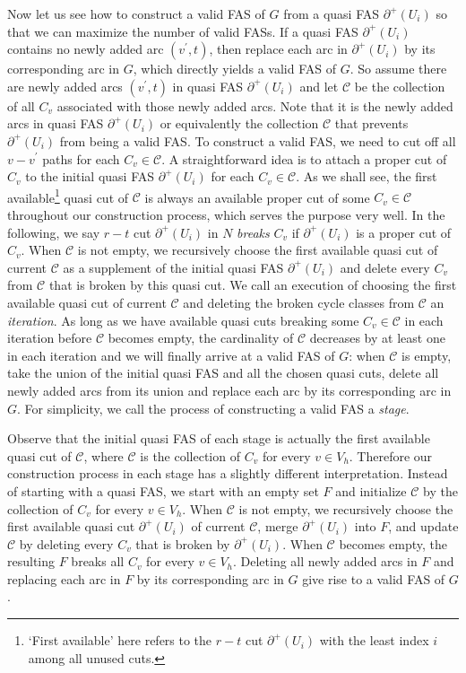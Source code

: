 \documentclass[11pt]{article}
\begin{document}
Now let us see how to construct a valid FAS of $G$ from a quasi FAS $\partial^+(U_i)$ so that we can maximize the number of valid FASs. If a quasi FAS $\partial^+(U_i)$ contains no newly added arc $(v^\prime,t)$, then replace each arc in $\partial^+(U_i)$ by its corresponding arc in $G$, which directly yields a valid FAS of $G$. So assume there are newly added arcs $(v^\prime,t)$ in quasi FAS $\partial^+(U_i)$ and let $\mathcal{C}$ be the collection of all $C_v$ associated with those newly added arcs. Note that it is the newly added arcs in quasi FAS $\partial^+(U_i)$ or equivalently the collection $\mathcal{C}$ that prevents $\partial^+(U_i)$ from being a valid FAS. To construct a valid FAS, we need to cut off all $v-v^\prime$ paths for each $C_v\in\mathcal{C}$. A straightforward idea is to attach a proper cut of $C_v$ to the initial quasi FAS $\partial^+(U_i)$ for each $C_v\in \mathcal{C}$. As we shall see, the first available\footnote{`First available' here refers to the $r-t$ cut $\partial^+(U_i)$ with the least index $i$ among all unused cuts.} quasi cut of $\mathcal{C}$ is always an available proper cut of some $C_v\in\mathcal{C}$ throughout our construction process, which serves the purpose very well. In the following, we say $r-t$ cut $\partial^+(U_i)$ in $N$ \emph{breaks} $C_v$ if $\partial^+(U_i)$ is a proper cut of $C_v$. When $\mathcal{C}$ is not empty, we recursively choose the first available quasi cut of current $\mathcal{C}$ as a supplement of the initial quasi FAS $\partial^+(U_i)$ and delete every $C_v$ from $\mathcal{C}$ that is broken by this quasi cut. We call an execution of choosing the first available quasi cut of current $\mathcal{C}$ and deleting the broken cycle classes from $\mathcal{C}$ an \emph{iteration}. As long as we have available quasi cuts breaking some $C_v\in\mathcal{C}$ in each iteration before $\mathcal{C}$ becomes empty, the cardinality of $\mathcal{C}$ decreases by at least one in each iteration and we will finally arrive at a valid FAS of $G$: when $\mathcal{C}$ is empty, take the union of the initial quasi FAS and all the chosen quasi cuts, delete all newly added arcs from its union and replace each arc by its corresponding arc in $G$. For simplicity, we call the process of constructing a valid FAS a \emph{stage}.

Observe that the initial quasi FAS of each stage is actually the first available quasi cut of $\mathcal{C}$, where $\mathcal{C}$ is the collection of $C_v$ for every $v\in V_h$. Therefore our construction process in each stage has a slightly different interpretation. Instead of starting with a quasi FAS, we start with an empty set $F$ and initialize $\mathcal{C}$ by the collection of $C_v$ for every $v\in V_h$. When $\mathcal{C}$ is not empty, we recursively choose the first available quasi cut $\partial^+(U_i)$ of current $\mathcal{C}$, merge $\partial^+(U_i)$ into $F$, and update $\mathcal{C}$ by deleting every $C_v$ that is broken by $\partial^+(U_i)$. When $\mathcal{C}$ becomes empty, the resulting $F$ breaks all $C_v$ for every $v\in V_h$. Deleting all newly added arcs in $F$ and replacing each arc in $F$ by its corresponding arc in $G$ give rise to a valid FAS of $G$.
\end{document}

